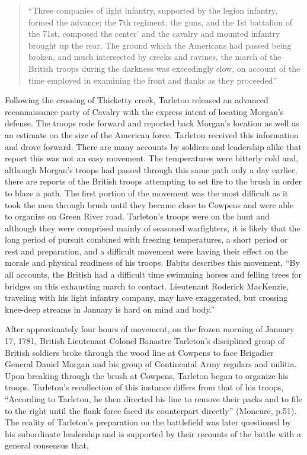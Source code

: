 \begin{quote}
 “Three companies of light infantry, supported by the legion infantry, formed
 the advance; the 7th regiment, the guns, and the 1st battalion of the 71st,
 composed the center’ and the cavalry and mounted infantry brought up the rear.
 The ground which the Americans had passed being broken, and much intersected by
 creeks and ravines, the march of the British troops during the darkness was
 exceedingly slow, on account of the time employed in examining the front and
 flanks as they proceeded”
 \cite[TAB Q, 14]{rauch_battle_2007}
\end{quote}

Following the crossing of Thicketty creek, Tarleton released an advanced
reconnaissance party of Cavalry with the express intent of locating Morgan’s
defense.  The troops rode forward and reported back Morgan’s location as well as
an estimate on the size of the American force.  Tarleton received this
information and drove forward.  There are many accounts by soldiers and
leadership alike that report this was not an easy movement.  The temperatures
were bitterly cold and, although Morgan's troops had passed through this same
path only a day earlier, there are reports of the British troops attempting to
set fire to the brush in order to blaze a path.   The first portion of the
movement was the most difficult as it took the men through brush until they
became close to Cowpens and were able to organize on Green River road.
Tarleton’s troops were on the hunt and although they were comprised mainly of
seasoned warfighters, it is likely that the long period of pursuit combined with
freezing temperatures, a short period or rest and preparation, and a difficult
movement were having their effect on the morale and physical readiness of his
troops.  Babits describes this movement, “By all accounts, the British had a
difficult time swimming horses and felling trees for bridges on this exhausting
march to contact.  Lieutenant Roderick MacKenzie, traveling with his light
infantry company, may have exaggerated, but crossing knee-deep streams in
January is hard on mind and body.” \cite[57]{babits_devil_2001}

After approximately four hours of movement, on the frozen morning of January 17,
1781, British Lieutenant Colonel Banastre Tarleton's disciplined group of
British soldiers broke through the wood line at Cowpens to face Brigadier
General Daniel Morgan and his group of Continental Army regulars and militia.
Upon breaking through the brush at Cowpens, Tarleton began to organize his
troops.  Tarleton’s recollection of this instance differs from that of his
troops, “According to Tarleton, he then directed his line to remove their packs
and to file to the right until the flank force faced its counterpart directly”
(Moncure, p.51).  The reality of Tarleton’s preparation on the battlefield was
later questioned by his subordinate leadership and is supported by their
recounts of the battle with a general consensus that,

